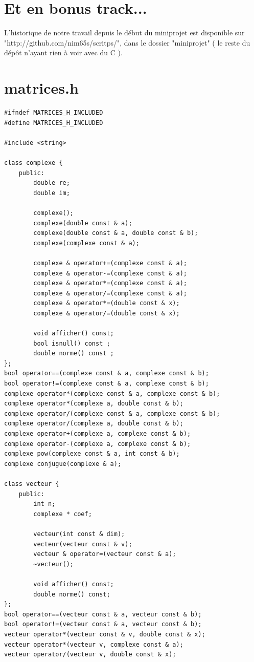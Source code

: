\documentclass[a4paper]{article}
\begin{document}
\section{Et en bonus track...}

L'historique de notre travail depuis le début du miniprojet est disponible sur "http://github.com/nim65s/scritps/", dans le dossier "miniprojet" ( le reste du dépôt n'ayant rien à voir avec du C ).

\newpage
\appendix

\section{matrices.h}
\begin{verbatim}
#ifndef MATRICES_H_INCLUDED
#define MATRICES_H_INCLUDED

#include <string>

class complexe {
    public:
        double re;
        double im;

        complexe();
        complexe(double const & a);
        complexe(double const & a, double const & b);
        complexe(complexe const & a);

        complexe & operator+=(complexe const & a);
        complexe & operator-=(complexe const & a);
        complexe & operator*=(complexe const & a);
        complexe & operator/=(complexe const & a);
        complexe & operator*=(double const & x);
        complexe & operator/=(double const & x);

        void afficher() const;
        bool isnull() const ;
        double norme() const ;
};
bool operator==(complexe const & a, complexe const & b);
bool operator!=(complexe const & a, complexe const & b);
complexe operator*(complexe const & a, complexe const & b);
complexe operator*(complexe a, double const & b);
complexe operator/(complexe const & a, complexe const & b);
complexe operator/(complexe a, double const & b);
complexe operator+(complexe a, complexe const & b);
complexe operator-(complexe a, complexe const & b);
complexe pow(complexe const & a, int const & b);
complexe conjugue(complexe & a);

class vecteur {
    public:
        int n;
        complexe * coef;

        vecteur(int const & dim);
        vecteur(vecteur const & v);
        vecteur & operator=(vecteur const & a);
        ~vecteur();

        void afficher() const;
        double norme() const;
};
bool operator==(vecteur const & a, vecteur const & b);
bool operator!=(vecteur const & a, vecteur const & b);
vecteur operator*(vecteur const & v, double const & x);
vecteur operator*(vecteur v, complexe const & a);
vecteur operator/(vecteur v, double const & x);


\end{verbatim}
\end{document}
